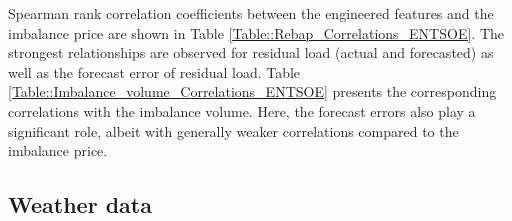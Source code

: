 \documentclass[class=scrbook, crop=false]{standalone}
\begin{document}
Spearman rank correlation coefficients between the engineered features and the imbalance price are shown in Table \ref{Table::Rebap_Correlations_ENTSOE}. The strongest relationships are observed for residual load (actual and forecasted) as well as the forecast error of residual load.
Table \ref{Table::Imbalance_volume_Correlations_ENTSOE} presents the corresponding correlations with the imbalance volume. Here, the forecast errors also play a significant role, albeit with generally weaker correlations compared to the imbalance price.



    
    




    
    
    \subsection{Weather data}
    \label{Section::Weather_data}
\end{document}
